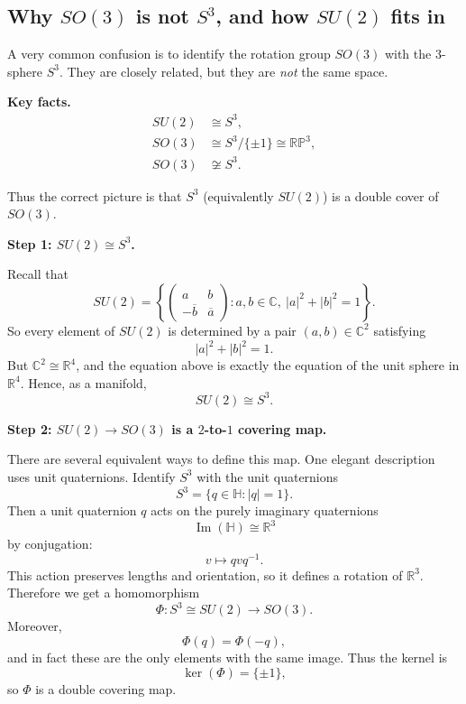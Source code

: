 \documentclass[12pt,a4paper]{article}
\theoremstyle{notespace}
\begin{document}
\subsection{\texorpdfstring{Why \(SO(3)\) is not \(S^3\), and how \(SU(2)\) fits in}{Why SO(3) is not S3, and how SU(2) fits in}}

A very common confusion is to identify the rotation group \(SO(3)\) with the \(3\)-sphere \(S^3\).
They are closely related, but they are \emph{not} the same space.

\medskip

\textbf{Key facts.}
\begin{align*}
	SU(2) &\cong S^3,\\
	SO(3) &\cong S^3/\{\pm 1\}\cong \mathbb{RP}^3,\\
	SO(3) &\not\cong S^3.
\end{align*}

Thus the correct picture is that \(S^3\) (equivalently \(SU(2)\)) is a double cover of \(SO(3)\).

\medskip

\textbf{Step 1: \(SU(2)\cong S^3\).}

Recall that
\[
SU(2)=\left\{
\begin{pmatrix}
	a & b\\
	-\overline b & \overline a
\end{pmatrix}
: a,b\in \mathbb C,\ |a|^2+|b|^2=1
\right\}.
\]
So every element of \(SU(2)\) is determined by a pair \((a,b)\in \mathbb C^2\) satisfying
\[
|a|^2+|b|^2=1.
\]
But \(\mathbb C^2\cong \mathbb R^4\), and the equation above is exactly the equation of the unit sphere in \(\mathbb R^4\). Hence, as a manifold,
\[
SU(2)\cong S^3.
\]

\medskip

\textbf{Step 2: \(SU(2)\to SO(3)\) is a \(2\)-to-\(1\) covering map.}

There are several equivalent ways to define this map. One elegant description uses unit quaternions.
Identify \(S^3\) with the unit quaternions
\[
S^3=\{q\in \mathbb H: |q|=1\}.
\]
Then a unit quaternion \(q\) acts on the purely imaginary quaternions
\[
\operatorname{Im}(\mathbb H)\cong \mathbb R^3
\]
by conjugation:
\[
v\longmapsto qvq^{-1}.
\]
This action preserves lengths and orientation, so it defines a rotation of \(\mathbb R^3\). Therefore we get a homomorphism
\[
\Phi:S^3\cong SU(2)\longrightarrow SO(3).
\]
Moreover,
\[
\Phi(q)=\Phi(-q),
\]
and in fact these are the only elements with the same image. Thus the kernel is
\[
\ker(\Phi)=\{\pm 1\},
\]
so \(\Phi\) is a double covering map.
\end{document}
